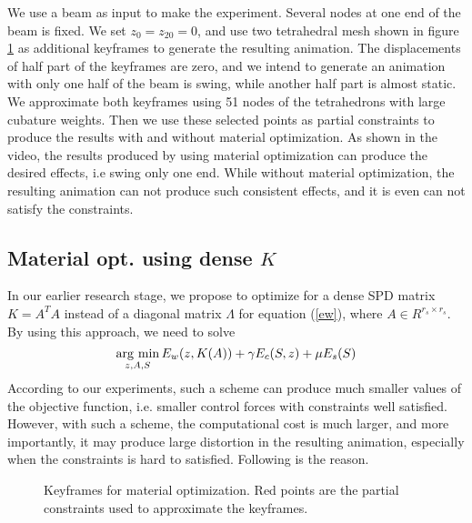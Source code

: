 \documentclass[9pt,twocolumn]{extarticle}
\newcommand{\argmin}{\operatornamewithlimits{arg\ min}}
\begin{document}
We use a beam as input to make the experiment. Several nodes at one end of the
beam is fixed. We set $z_0=z_{20}=0$, and use two tetrahedral mesh shown in
figure \ref{key_beam} as additional keyframes to generate the resulting
animation. The displacements of half part of the keyframes are zero, and we
intend to generate an animation with only one half of the beam is swing, while
another half part is almost static. We approximate both keyframes using 51 nodes
of the tetrahedrons with large cubature weights. Then we use these selected
points as partial constraints to produce the results with and without material
optimization. As shown in the video, the results produced by using material
optimization can produce the desired effects, i.e swing only one end. While
without material optimization, the resulting animation can not produce such
consistent effects, and it is even can not satisfy the constraints. 

\subsection{Material opt. using dense $K$}
In our earlier research stage, we propose to optimize for a dense SPD matrix
$K=A^TA$ instead of a diagonal matrix $\Lambda$ for equation (\ref{ew}), where
$A\in R^{r_s\times r_s}$. By using this approach, we need to solve
\begin{equation} \label{mtl-opt_dense_seq}
  \argmin_{z,A,S} E_w(z,K(A))+\gamma E_c(S,z)+\mu E_s(S)
\end{equation}
According to our experiments, such a scheme can produce much smaller values of
the objective function, i.e. smaller control forces with constraints well
satisfied. However, with such a scheme, the computational cost is much larger,
and more importantly, it may produce large distortion in the resulting
animation, especially when the constraints is hard to satisfied. Following is
the reason.
\begin{figure}
  \centering
  \caption{Keyframes for material optimization. Red points are the partial
    constraints used to approximate the keyframes.}
  \label{key_beam}
\end{figure}
\end{document}

